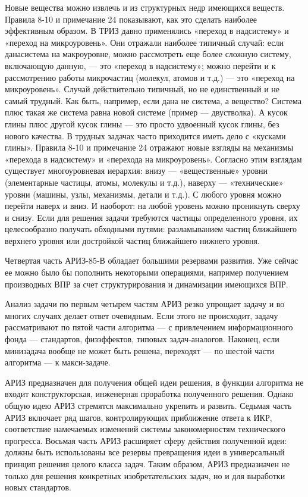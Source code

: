 Новые вещества можно извлечь и  из структурных недр имеющихся веществ.
Правила  8-10 и  примечание 24  показывают, как  это сделать  наиболее
эффективным образом. В ТРИЗ давно применялись «переход в надсистему» и
«переход на микроуровень». Они отражали наиболее типичный случай: если
данасистема  на  макроуровне,  можно  рассмотреть  еще  более  сложную
систему,  включающую  данную,  —  это «переход  в  надсистему»;  можно
перейти и к рассмотрению работы микрочастиц (молекул, атомов и т.д.) —
это «переход  на микроуровень».  Случай действительно типичный,  но не
единственный  и не  самый трудный.  Как быть,  например, если  дана не
система,  а  вещество?  Система  плюс такая  же  система  равна  новой
системе  (пример  —  двустволка).  А кусок  глины  плюс  другой  кусок
глины  — это  просто удвоенный  кусок  глины, без  нового качества.  В
трудных  задачах  часто  приходится  иметь  дело  с  «кусками  глины».
Правила  8-10 и  примечание  24 отражают  новые  взгляды на  механизмы
«перехода в  надсистему» и  «перехода на микроуровень».  Согласно этим
взглядам  существует многоуровневая  иерархия: внизу  — «вещественные»
уровни  (элементарные  частицы, атомы,  молекулы  и  т.д.), наверху  —
«технические»  уровни  (машины, узлы,  механизмы,  детали  и т.д.).  С
любого  уровня можно  перейти  наверх  и вниз.  И  наоборот: на  любой
уровень  можно проникнуть  сверху  и снизу.  Если  для решения  задачи
требуются  частицы  определенного  уровня, их  целесообразно  получать
обходными путями: разламыванием частиц  ближайшего верхнего уровня или
достройкой частиц ближайшего нижнего уровня.

Четвертая часть  АРИЗ-85-В обладает  большими резервами  развития. Уже
сейчас  ее можно  было  бы пополнить  некоторыми операциями,  например
получением  производных ВПР  за  счет  структурирования и  динамизации
имеющихся ВПР.

Анализ   задачи  по   первым  четырем   частям  АРИЗ   резко  упрощает
задачу  и  во  многих  случаях  делает  ответ  очевидным.  Если  этого
не  происходит, задачу  рассматривают  по пятой  части  алгоритма —  с
привлечением информационного фонда  — стандартов, физэффектов, типовых
задач-аналогов. Наконец, если минизадача  вообще не может быть решена,
переходят — по шестой части алгоритма — к макси-задаче.

АРИЗ  предназначен  для  получения   общей  идеи  решения,  в  функции
алгоритма не входит конструкторская, инженерная проработка полученного
решения.  Однако  общую идею  АРИЗ  стремятся  максимально укрепить  и
развить.  Седьмая  часть  АРИЗ   включает  ряд  шагов,  контролирующих
приближение ответа  к ИКР,  соответствие намечаемых  изменений системы
закономерностям технического  прогресса. Восьмая часть  АРИЗ расширяет
сферу действия  полученной идеи: должны быть  использованы все резервы
превращения идеи в универсальный  принцип решения целого класса задач.
Таким  образом, АРИЗ  предназначен  не только  для решения  конкретных
изобретательских задач, но и для выработки новых стандартов.

